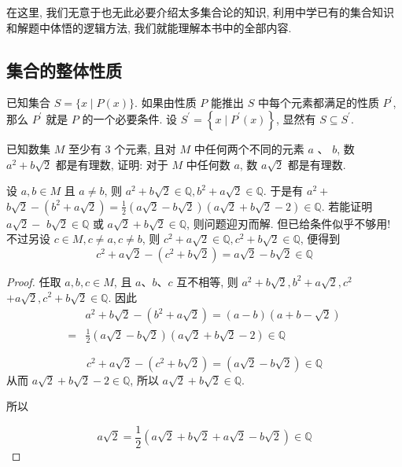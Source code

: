 在这里, 我们无意于也无此必要介绍太多集合论的知识, 利用中学已有的集合知识和解题中体悟的逻辑方法, 我们就能理解本书中的全部内容.

\subsection{集合的整体性质}
已知集合 $S=\{x \mid P(x)\}$. 如果由性质 $P$ 能推出 $S$ 中每个元素都满足的性质 $P^{\prime}$, 那么 $P^{\prime}$ 就是 $P$ 的一个必要条件. 设 $S^{\prime}=\left\{x \mid P^{\prime}(x)\right\}$, 显然有 $S \subseteq S^{\prime}$.
\begin{example}
	已知数集 $M$ 至少有 3 个元素, 且对 $M$ 中任何两个不同的元素 $a$ 、 $b$, 数 $a^{2}+b \sqrt{2}$ 都是有理数, 证明: 对于 $M$ 中任何数 $a$, 数 $a \sqrt{2}$ 都是有理数.
\end{example}
\begin{analysis}
	设 $a, b \in M$ 且 $a \neq b$, 则 $a^{2}+b \sqrt{2} \in \mathbb{Q}, b^{2}+a \sqrt{2} \in \mathbb{Q}$. 于是有 $a^{2}+$ $b \sqrt{2}-\left(b^{2}+a \sqrt{2}\right)=\frac{1}{2}(a \sqrt{2}-b \sqrt{2})(a \sqrt{2}+b \sqrt{2}-2) \in \mathbb{Q}$. 若能证明 $a \sqrt{2}-$ $b \sqrt{2} \in \mathbb{Q}$ 或 $a \sqrt{2}+b \sqrt{2} \in \mathbb{Q}$, 则问题迎刃而解. 但已给条件似乎不够用! 不过另设 $c \in M, c \neq a, c \neq b$, 则 $c^{2}+a \sqrt{2} \in \mathbb{Q}, c^{2}+b \sqrt{2} \in \mathbb{Q}$, 便得到
	$$
		c^{2}+a \sqrt{2}-\left(c^{2}+b \sqrt{2}\right)=a \sqrt{2}-b \sqrt{2} \in \mathbb{Q}
	$$
\end{analysis}
\begin{proof}
	任取 $a, b, c \in M$, 且 $a 、 b 、 c$ 互不相等, 则 $a^{2}+b \sqrt{2}, b^{2}+a \sqrt{2}, c^{2}$ $+a \sqrt{2}, c^{2}+b \sqrt{2} \in \mathbb{Q}$. 因此
	$$
		\begin{aligned}
			  & a^{2}+b \sqrt{2}-\left(b^{2}+a \sqrt{2}\right)=(a-b)(a+b-\sqrt{2})         \\
			= & \frac{1}{2}(a \sqrt{2}-b \sqrt{2})(a \sqrt{2}+b \sqrt{2}-2) \in \mathbb{Q}
		\end{aligned}
	$$

	$$
		c^{2}+a \sqrt{2}-\left(c^{2}+b \sqrt{2}\right)=(a \sqrt{2}-b \sqrt{2}) \in \mathbb{Q}
	$$
	从而 $a \sqrt{2}+b \sqrt{2}-2 \in \mathbb{Q}$, 所以 $a \sqrt{2}+b \sqrt{2} \in \mathbb{Q}$.

	所以

	$$
		a \sqrt{2}=\frac{1}{2}(a \sqrt{2}+b \sqrt{2}+a \sqrt{2}-b \sqrt{2}) \in \mathbb{Q}
	$$
\end{proof}

